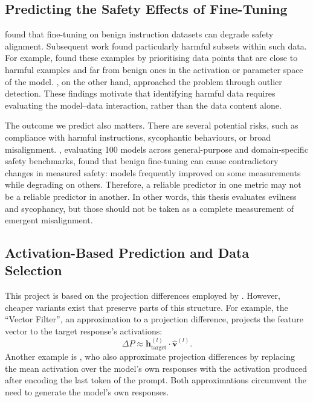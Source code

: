 \subsection{Predicting the Safety Effects of Fine-Tuning}
\citet{qi2024finetuning} found that fine-tuning on benign instruction datasets can degrade safety alignment. Subsequent work found particularly harmful subsets within such data. For example, \citet{he2024what} found these examples by prioritising data points that are close to harmful examples and far from benign ones in the activation or parameter space of the model. \citet{guan2025benign}, on the other hand, approached the problem through outlier detection. These findings motivate that identifying harmful data requires evaluating the model--data interaction, rather than the data content alone. 

The outcome we predict also matters. There are several potential risks, such as compliance with harmful instructions, sycophantic behaviours, or broad misalignment. \citet{khan2026safetydriftfinetuningevidence}, evaluating 100 models across general-purpose and domain-specific safety benchmarks, found that benign fine-tuning can cause contradictory changes in measured safety: models frequently improved on some measurements while degrading on others. Therefore, a reliable predictor in one metric may not be a reliable predictor in another. In other words, this thesis evaluates evilness and sycophancy, but those should not be taken as a complete measurement of emergent misalignment.

\subsection{Activation-Based Prediction and Data Selection}
This project is based on the projection differences employed by \citet{chen2025persona_vectors}. However, cheaper variants exist that preserve parts of this structure. For example, the ``Vector Filter'', an approximation to a projection difference, projects the feature vector to the target response's activations:
\begin{equation}
    \Delta P \approx \mathbf{h}_{\text{target}}^{(l)} \cdot \hat{\mathbf{v}}^{(l)}.
\end{equation}
Another example is \citet[][Appendix~I]{chen2025persona_vectors}, who also approximate projection
differences by replacing the mean activation over the model's own responses with the activation produced after encoding the last token of the prompt. Both approximations circumvent the need to generate the model's own responses.

